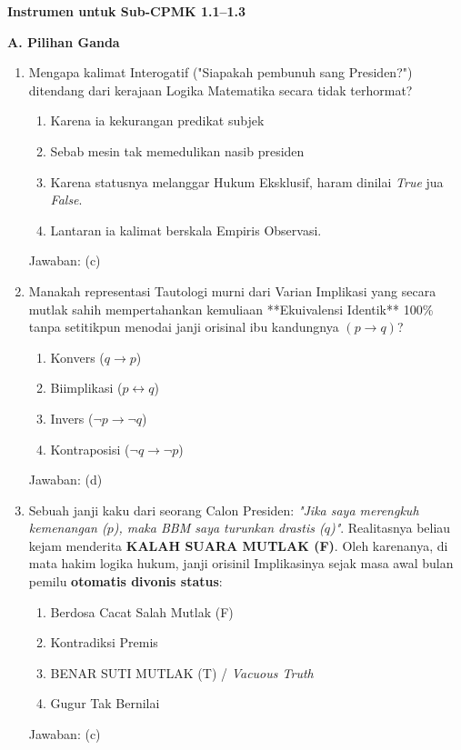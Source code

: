 \documentclass[../main]{subfiles}
\begin{document}
\begin{asesmen}
\textbf{Instrumen untuk Sub-CPMK 1.1--1.3}

\textbf{A. Pilihan Ganda}

\begin{enumerate}
  \item Mengapa kalimat Interogatif ("Siapakah pembunuh sang Presiden?") ditendang dari kerajaan Logika Matematika secara tidak terhormat?
  \begin{enumerate}
    \item Karena ia kekurangan predikat subjek
    \item Sebab mesin tak memedulikan nasib presiden 
    \item Karena statusnya melanggar Hukum Eksklusif, haram dinilai \textit{True} jua \textit{False}.
    \item Lantaran ia kalimat berskala Empiris Observasi.
  \end{enumerate}
  Jawaban: (c)

  \item Manakah representasi Tautologi murni dari Varian Implikasi yang secara mutlak sahih mempertahankan kemuliaan **Ekuivalensi Identik** 100\% tanpa setitikpun menodai janji orisinal ibu kandungnya $(p \rightarrow q)$?
  \begin{enumerate}
    \item Konvers ($q \rightarrow p$)
    \item Biimplikasi ($p \leftrightarrow q$)
    \item Invers ($\neg p \rightarrow \neg q$)
    \item Kontraposisi ($\neg q \rightarrow \neg p$)
  \end{enumerate}
  Jawaban: (d)
  
  \item Sebuah janji kaku dari seorang Calon Presiden: \textit{"Jika saya merengkuh kemenangan ($p$), maka BBM saya turunkan drastis ($q$)"}. Realitasnya beliau kejam menderita \textbf{KALAH SUARA MUTLAK (F)}. Oleh karenanya, di mata hakim logika hukum, janji orisinil Implikasinya sejak masa awal bulan pemilu \textbf{otomatis divonis status}:
  \begin{enumerate}
    \item Berdosa Cacat Salah Mutlak (F)
    \item Kontradiksi Premis
    \item BENAR SUTI MUTLAK (T) / \textit{Vacuous Truth}
    \item Gugur Tak Bernilai
  \end{enumerate}
  Jawaban: (c)
\end{enumerate}


\end{asesmen}
\end{document}

